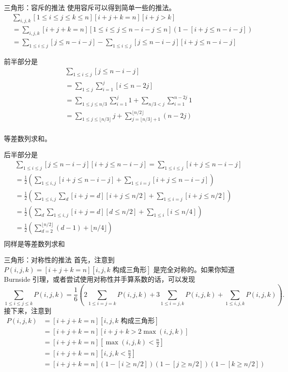 \begin{frame}{三角形：容斥的推法}
    使用容斥可以得到简单一些的推法。
    $$
    \begin{aligned}
        &\sum_{i,j,k}[1\le i\le j\le k\le n][i+j+k=n][i+j>k]\\
        &=\sum_{i,j,k}[i+j+k=n][1\le i\le j\le n-i-j\le n](1-[i+j\le n-i-j])\\
        &=\sum_{1\le i\le j}[j\le n-i-j]-\sum_{1\le i\le j}[j\le n-i-j][i+j\le n-i-j]
    \end{aligned}
    $$
\end{frame}
\begin{frame}
    前半部分是
    $$
    \begin{aligned}
        &\sum_{1\le i\le j}[j\le n-i-j]\\
        &=\sum_{1\le j}\sum_{i=1}^j[i\le n-2j]\\
        &=\sum_{1\le j\le n/3}\sum_{i=1}^j 1+\sum_{n/3<j}\sum_{i=1}^{n-2j}1\\
        &=\sum_{1\le j\le \lfloor n/3\rfloor}j+\sum_{j=\lfloor n/3\rfloor+1}^{\lfloor n/2\rfloor}(n-2j)\\
    \end{aligned}
    $$    

    等差数列求和。
\end{frame}
\begin{frame}
    后半部分是
    $$
    \begin{aligned}
        &\sum_{1\le i\le j}[j\le n-i-j][i+j\le n-i-j]=\sum_{1\le i\le j}[i+j\le n-i-j]\\
        &=\frac{1}{2}\left(\sum_{1\le i,j}[i+j\le n-i-j]+\sum_{1\le i=j}[i+j\le n-i-j]\right)\\
        &=\frac{1}{2}\left(\sum_{1\le i,j}\sum_d[i+j=d][i+j\le n/2]+\sum_{1\le i=j}[i+j\le n/2]\right)\\
        &=\frac{1}{2}\left(\sum_d\sum_{1\le i,j}[i+j=d][d\le n/2]+\sum_{1\le i}[i\le n/4]\right)\\
        &=\frac{1}{2}\left(\sum_{d=2}^{\lfloor n/2\rfloor}(d-1)+\lfloor n/4\rfloor\right)\\
    \end{aligned}
    $$
    同样是等差数列求和    
\end{frame}
\begin{frame}{三角形：对称性的推法}
    首先，注意到 $P(i,j,k)=[i+j+k=n][i,j,k\text{ 构成三角形}]$ 是完全对称的。如果你知道 Burnside 引理，或者尝试使用对称性并手算系数的话，可以发现
    $$
    \sum_{1\le i\le j\le k}P(i,j,k)=\frac{1}{6}\left(2\sum_{1\le i=j=k} P(i,j,k)+3\sum_{1\le i=j,k}P(i,j,k)+\sum_{1\le i,j,k}P(i,j,k)\right).
    $$
    接下来，注意到
    $$
    \begin{aligned}
    P(i,j,k)&=[i+j+k=n][i,j,k\text{ 构成三角形}]\\
    &=[i+j+k=n][i+j+k>2\max(i,j,k)]\\
    &=[i+j+k=n][\max(i,j,k)<\frac{n}{2}]\\
    &=[i+j+k=n][i,j,k<\frac{n}{2}]\\
    &=[i+j+k=n](1-[i\ge n/2])(1-[j\ge n/2])(1-[k\ge n/2])\\
    \end{aligned}
    $$
\end{frame}
